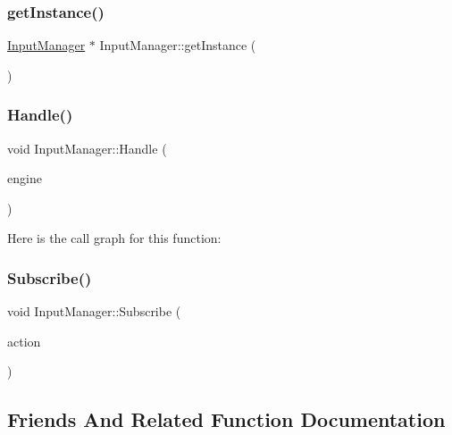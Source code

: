 \subsubsection{\texorpdfstring{get\+Instance()}{getInstance()}}
{\footnotesize\ttfamily \hyperlink{class_mason_1_1_input_manager}{Input\+Manager} $\ast$ Input\+Manager\+::get\+Instance (\begin{DoxyParamCaption}{ }\end{DoxyParamCaption})\hspace{0.3cm}{\ttfamily [static]}}

\hypertarget{class_mason_1_1_input_manager_a471142ccebfdb1574c342fa6a831f244}{}\label{class_mason_1_1_input_manager_a471142ccebfdb1574c342fa6a831f244} 
\subsubsection{\texorpdfstring{Handle()}{Handle()}}
{\footnotesize\ttfamily void Input\+Manager\+::\+Handle (\begin{DoxyParamCaption}\item[{\hyperlink{class_mason_1_1_engine}{Engine} $\ast$}]{engine }\end{DoxyParamCaption})}

Here is the call graph for this function\+:
\hypertarget{class_mason_1_1_input_manager_a14e32a051270da528c2c88674d8b5d22}{}\label{class_mason_1_1_input_manager_a14e32a051270da528c2c88674d8b5d22} 
\subsubsection{\texorpdfstring{Subscribe()}{Subscribe()}}
{\footnotesize\ttfamily void Input\+Manager\+::\+Subscribe (\begin{DoxyParamCaption}\item[{void($\ast$)(S\+D\+L\+\_\+\+Event)}]{action }\end{DoxyParamCaption})}



\subsection{Friends And Related Function Documentation}
\hypertarget{class_mason_1_1_input_manager_a3e1914489e4bed4f9f23cdeab34a43dc}{}\label{class_mason_1_1_input_manager_a3e1914489e4bed4f9f23cdeab34a43dc} 
